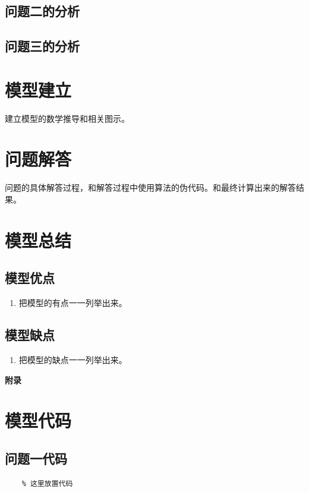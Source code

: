 \documentclass{cumcm}
\begin{document}
\subsection{问题二的分析}

\subsection{问题三的分析}

\section{模型建立}
建立模型的数学推导和相关图示。

\section{问题解答}
问题的具体解答过程，和解答过程中使用算法的伪代码。和最终计算出来的解答结果。

\section{模型总结}
\subsection{模型优点}
\begin{enumerate}
	\item 把模型的有点一一列举出来。
\end{enumerate}

\subsection{模型缺点}
\begin{enumerate}
	\item 把模型的缺点一一列举出来。
\end{enumerate}




\newpage
\appendix
\textbf{附录}
\section{模型代码}
\subsection{问题一代码}
\begin{lstlisting}
	% 这里放置代码
\end{lstlisting}
\end{document}
